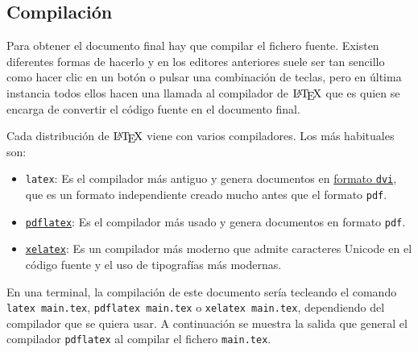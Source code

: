 \documentclass[
  a4paper,
]{scrreport}
\providecommand{\tightlist}{%
  \setlength{\itemsep}{0pt}\setlength{\parskip}{0pt}}\usepackage{longtable,booktabs,array}
\begin{document}
\hypertarget{compilaciuxf3n}{%
\subsection{Compilación}\label{compilaciuxf3n}}

Para obtener el documento final hay que compilar el fichero fuente.
Existen diferentes formas de hacerlo y en los editores anteriores suele
ser tan sencillo como hacer clic en un botón o pulsar una combinación de
teclas, pero en última instancia todos ellos hacen una llamada al
compilador de \(\text{\LaTeX}\) que es quien se encarga de convertir el
código fuente en el documento final.

Cada distribución de \(\text{\LaTeX}\) viene con varios compiladores.
Los más habituales son:

\begin{itemize}
\tightlist
\item
  \texttt{latex}: Es el compilador más antiguo y genera documentos en
  \href{https://es.wikipedia.org/wiki/DVI_(TeX)}{formato \texttt{dvi}},
  que es un formato independiente creado mucho antes que el formato
  \texttt{pdf}.
\item
  \href{https://www.tug.org/applications/pdftex/}{\texttt{pdflatex}}: Es
  el compilador más usado y genera documentos en formato \texttt{pdf}.
\item
  \href{https://tug.org/xetex/}{\texttt{xelatex}}: Es un compilador más
  moderno que admite caracteres Unicode en el código fuente y el uso de
  tipografías más modernas.
\end{itemize}

En una terminal, la compilación de este documento sería tecleando el
comando \texttt{latex\ main.tex}, \texttt{pdflatex\ main.tex} o
\texttt{xelatex\ main.tex}, dependiendo del compilador que se quiera
usar. A continuación se muestra la salida que general el compilador
\texttt{pdflatex} al compilar el fichero \texttt{main.tex}.
\end{document}

